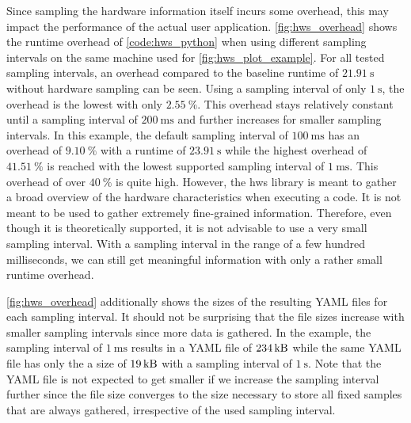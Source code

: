 Since sampling the hardware information itself incurs some overhead, this may impact the performance of the actual user application. 
\autoref{fig:hws_overhead} shows the runtime overhead of \autoref{code:hws_python} when using different sampling intervals on the same machine used for \autoref{fig:hws_plot_example}. 
For all tested sampling intervals, an overhead compared to the baseline runtime of $\SI{21.91}{\second}$ without hardware sampling can be seen. 
Using a sampling interval of only $\SI{1}{\second}$, the overhead is the lowest with only $\SI{2.55}{\percent}$. 
This overhead stays relatively constant until a sampling interval of $\SI{200}{\milli\second}$ and further increases for smaller sampling intervals. 
In this example, the default sampling interval of $\SI{100}{\milli\second}$ has an overhead of $\SI{9.10}{\percent}$ with a runtime of $\SI{23.91}{\second}$ while the highest overhead of $\SI{41.51}{\percent}$ is reached with the lowest supported sampling interval of $\SI{1}{\milli\second}$. 
This overhead of over $\SI{40}{\percent}$ is quite high. 
However, the hws library is meant to gather a broad overview of the hardware characteristics when executing a code. 
It is not meant to be used to gather extremely fine-grained information. 
Therefore, even though it is theoretically supported, it is not advisable to use a very small sampling interval. 
With a sampling interval in the range of a few hundred milliseconds, we can still get meaningful information with only a rather small runtime overhead. 

\autoref{fig:hws_overhead} additionally shows the sizes of the resulting YAML files for each sampling interval. 
It should not be surprising that the file sizes increase with smaller sampling intervals since more data is gathered. 
In the example, the sampling interval of $\SI{1}{\milli\second}$ results in a YAML file of $\SI{234}{\kilo\byte}$ while the same YAML file has only the a size of $\SI{19}{\kilo\byte}$ with a sampling interval of $\SI{1}{\second}$. 
Note that the YAML file is not expected to get smaller if we increase the sampling interval further since the file size converges to the size necessary to store all fixed samples that are always gathered, irrespective of the used sampling interval. 
